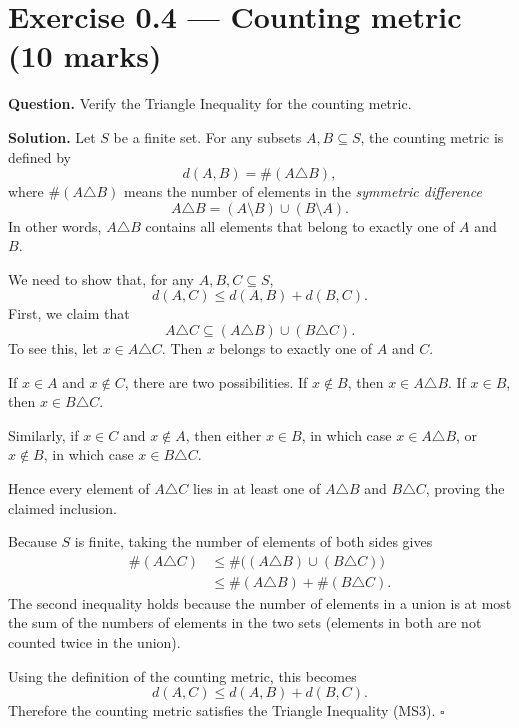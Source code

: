 \documentclass[11pt,a4paper]{article}
\begin{document}
\section*{Exercise 0.4 --- Counting metric \hfill \normalsize (10 marks)}
\textbf{Question.} Verify the Triangle Inequality for the counting metric.

\textbf{Solution.}
Let $S$ be a finite set. For any subsets $A,B\subseteq S$, the counting metric is defined by
\[
 d(A,B)=\#(A\triangle B),
\]
where $\#(A\triangle B)$ means the number of elements in the \emph{symmetric difference}
\[
 A\triangle B=(A\setminus B)\cup(B\setminus A).
\]
In other words, $A\triangle B$ contains all elements that belong to exactly one of $A$ and $B$.

We need to show that, for any $A,B,C\subseteq S$,
\[
 d(A,C)\le d(A,B)+d(B,C).
\]
First, we claim that
\[
 A\triangle C\subseteq (A\triangle B)\cup(B\triangle C).
\]
To see this, let $x\in A\triangle C$. Then $x$ belongs to exactly one of $A$ and $C$.

If $x\in A$ and $x\notin C$, there are two possibilities. If $x\notin B$, then $x\in A\triangle B$. If $x\in B$, then $x\in B\triangle C$.

Similarly, if $x\in C$ and $x\notin A$, then either $x\in B$, in which case $x\in A\triangle B$, or $x\notin B$, in which case $x\in B\triangle C$.

Hence every element of $A\triangle C$ lies in at least one of $A\triangle B$ and $B\triangle C$, proving the claimed inclusion.

Because $S$ is finite, taking the number of elements of both sides gives
\begin{align*}
\#(A\triangle C)
&\le \#\bigl((A\triangle B)\cup(B\triangle C)\bigr)\\
&\le \#(A\triangle B)+\#(B\triangle C).
\end{align*}
The second inequality holds because the number of elements in a union is at most the sum of the numbers of elements in the two sets (elements in both are not counted twice in the union).

Using the definition of the counting metric, this becomes
\[
 \boxed{d(A,C)\le d(A,B)+d(B,C).}
\]
Therefore the counting metric satisfies the Triangle Inequality (MS3). \(\square\)
\end{document}
